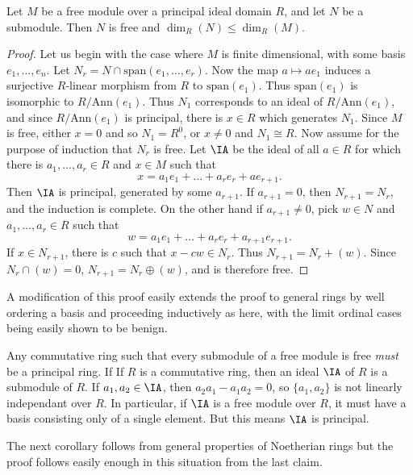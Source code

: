 \begin{lemma}
    Let $M$ be a free module over a principal ideal domain $R$, and let $N$ be a submodule. Then $N$ is free and $\dim_R(N) \leq \dim_R(M)$.
\end{lemma}
\begin{proof}
    Let us begin with the case where $M$ is finite dimensional, with some basis $e_1,\dots,e_n$. Let $N_r = N \cap \text{span}(e_1,\dots,e_r)$. Now the map $a \mapsto ae_1$ induces a surjective $R$-linear morphism from $R$ to $\text{span}(e_1)$. Thus $\text{span}(e_1)$ is isomorphic to $R/\text{Ann}(e_1)$. Thus $N_1$ corresponds to an ideal of $R/\text{Ann}(e_1)$, and since $R/\text{Ann}(e_1)$ is principal, there is $x \in R$ which generates $N_1$. Since $M$ is free, either $x = 0$ and so $N_1 = R^0$, or $x \neq 0$ and $N_1 \cong R$. Now assume for the purpose of induction that $N_r$ is free. Let $\IA$ be the ideal of all $a \in R$ for which there is $a_1,\dots,a_r \in R$ and $x \in M$ such that
    \[ x = a_1e_1 + \dots + a_re_r + ae_{r+1}. \]
    Then $\IA$ is principal, generated by some $a_{r+1}$. If $a_{r+1} = 0$, then $N_{r+1} = N_r$, and the induction is complete. On the other hand if $a_{r+1} \neq 0$, pick $w \in N$ and $a_1,\dots,a_r \in R$ such that
    \[ w = a_1e_1 + \dots + a_re_r + a_{r+1}e_{r+1}. \]
    If $x \in N_{r+1}$, there is $c$ such that $x - cw \in N_r$. Thus $N_{r+1} = N_r + (w)$. Since $N_r \cap (w) = 0$, $N_{r+1} = N_r \oplus (w)$, and is therefore free.
\end{proof}

\begin{remark}
    A modification of this proof easily extends the proof to general rings by well ordering a basis and proceeding inductively as here, with the limit ordinal cases being easily shown to be benign.
\end{remark}

\begin{remark}
    Any commutative ring such that every submodule of a free module is free \emph{must} be a principal ring. If If $R$ is a commutative ring, then an ideal $\IA$ of $R$ is a submodule of $R$. If $a_1,a_2 \in \IA$, then $a_2a_1 - a_1a_2 = 0$, so $\{ a_1,a_2 \}$ is not linearly independant over $R$. In particular, if $\IA$ is a free module over $R$, it must have a basis consisting only of a single element. But this means $\IA$ is principal.
\end{remark}

The next corollary follows from general properties of Noetherian rings but the proof follows easily enough in this situation from the last claim.

